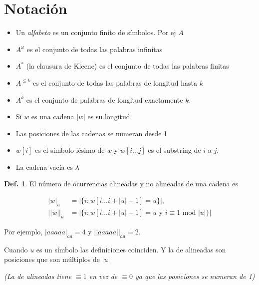 \documentclass{report}
\theoremstyle{definition} %
\newtheorem{definition}{Def.}
\begin{document}
\section{Notación}

\begin{itemize}
    \item Un \textit{alfabeto} es un conjunto finito de símbolos. Por ej $A$
    \item $A^\omega$ es el conjunto de todas las palabras infinitas
    \item $A^*$ (la clausura de Kleene) es el conjunto de todas las palabras finitas
    \item $A^{\leq k}$ es el conjunto de todas las palabras de longitud hasta $k$
    \item $A^{k}$ es el conjunto de palabras de longitud exactamente $k$.
    \item Si $w$ es una cadena $|w|$ es su longitud.
    \item Las posiciones de las cadenas se numeran desde 1
    \item $w[i]$ es el simbolo iésimo de $w$ y $w[i\dots j]$ es el substring de
    $i$ a $j$.
    \item La cadena vacía es $\lambda$
\end{itemize}

\begin{definition}
    El número de ocurrencias alineadas y no alineadas de una cadena es

    \begin{align*}
        |w|_u &= |\{ i : w[i\dots i+|u| - 1] = u\}|,\\
        ||w||_u &= |\{ i : w[i\dots i+|u| - 1] = u \text{ y } i \equiv 1 \text{ mod } |u|\}|
    \end{align*}

    Por ejemplo, $|aaaaa|_{aa} = 4$ y $||aaaaa||_{aa} = 2$.

    Cuando $u$ es un símbolo las definiciones coinciden. Y la de alineadas son
    posiciones que son múltiplos de $|u|$

    \textit{(La de alineadas tiene $\equiv 1$ en vez de $\equiv 0$ ya que las posiciones se numeran de 1)}
\end{definition}
\end{document}
